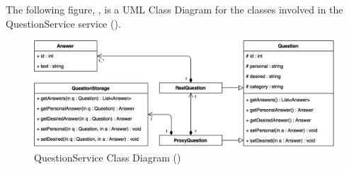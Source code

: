 \documentclass[12pt,letterpaper]{article}
\begin{document}
\newpage{}
The following figure, , is a UML Class Diagram for the classes involved in the QuestionService service ().

\begin{figure}[H]
	\centering{}
	\includegraphics[scale=0.32]{imgs/d3/interfaces/question.png}
	\caption{QuestionService Class Diagram ()}
\end{figure}
\end{document}
